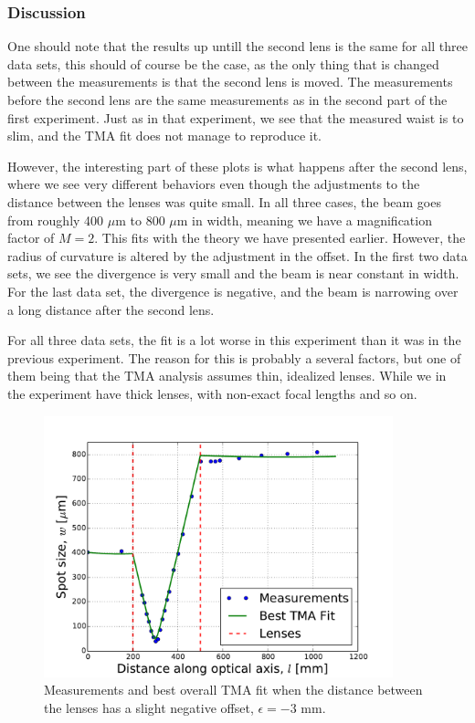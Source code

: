 \documentclass[a4paper, 11pt, notitlepage, english]{article}
\begin{document}
\subsubsection{Discussion}

One should note that the results up untill the second lens is the same for all three data sets, this should of course be the case, as the only thing that is changed between the measurements is that the second lens is moved. The measurements before the second lens are the same measurements as in the second part of the first experiment. Just as in that experiment, we see that the measured waist is to slim, and the TMA fit does not manage to reproduce it.

However, the interesting part of these plots is what happens after the second lens, where we see very different behaviors even though the adjustments to the distance between the lenses was quite small. In all three cases, the beam goes from roughly 400 $\mu$m to 800 $\mu$m in width, meaning we have a magnification factor of $M=2$. This fits with the theory we have presented earlier. However, the radius of curvature is altered by the adjustment in the offset. In the first two data sets, we see the divergence is very small and the beam is near constant in width. For the last data set, the divergence is negative, and the beam is narrowing over a long distance after the second lens.

For all three data sets, the fit is a lot worse in this experiment than it was in the previous experiment. The reason for this is probably a several factors, but one of them being that the TMA analysis assumes thin, idealized lenses. While we in the experiment have thick lenses, with non-exact focal lengths and so on.

\begin{figure}[h!t]
\centering
\includegraphics[width=0.9\textwidth]{beam_expander_dataset_0.pdf}	
\caption{Measurements and best overall TMA fit when the distance between the lenses has a slight negative offset, $\epsilon = -3$ mm. \label{fig:e2r1}}
\end{figure}
\end{document}
